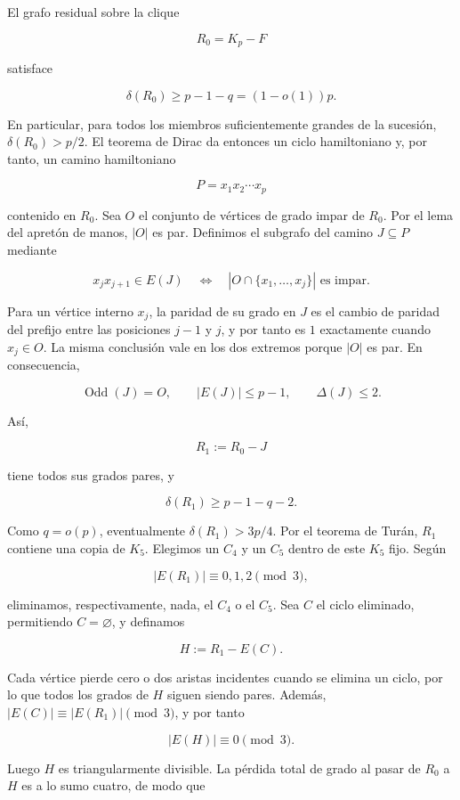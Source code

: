 \documentclass[
  11pt,
]{article}
\begin{document}
El grafo residual sobre la clique

\[
R_0=K_p-F
\]

satisface

\[
\delta(R_0)
\ge
p-1-q
=(1-o(1))p.
\tag{8.4}
\]

En particular, para todos los miembros suficientemente grandes de la
sucesión, \(\delta(R_0)>p/2\). El teorema de Dirac da entonces un ciclo
hamiltoniano y, por tanto, un camino hamiltoniano

\[
P=x_1x_2\cdots x_p
\]

contenido en \(R_0\). Sea \(O\) el conjunto de vértices de grado impar
de \(R_0\). Por el lema del apretón de manos, \(|O|\) es par. Definimos
el subgrafo del camino \(J\subseteq P\) mediante

\[
x_jx_{j+1}\in E(J)
\quad\Longleftrightarrow\quad
|O\cap\{x_1,\ldots,x_j\}|\text{ es impar}.
\tag{8.5}
\]

Para un vértice interno \(x_j\), la paridad de su grado en \(J\) es el
cambio de paridad del prefijo entre las posiciones \(j-1\) y \(j\), y
por tanto es \(1\) exactamente cuando \(x_j\in O\). La misma conclusión
vale en los dos extremos porque \(|O|\) es par. En consecuencia,

\[
\operatorname{Odd}(J)=O,
\qquad
|E(J)|\le p-1,
\qquad
\Delta(J)\le2.
\tag{8.6}
\]

Así,

\[
R_1:=R_0-J
\]

tiene todos sus grados pares, y

\[
\delta(R_1)\ge p-1-q-2.
\tag{8.7}
\]

Como \(q=o(p)\), eventualmente \(\delta(R_1)>3p/4\). Por el teorema de
Turán, \(R_1\) contiene una copia de \(K_5\). Elegimos un \(C_4\) y un
\(C_5\) dentro de este \(K_5\) fijo. Según

\[
|E(R_1)|\equiv0,1,2\pmod3,
\]

eliminamos, respectivamente, nada, el \(C_4\) o el \(C_5\). Sea \(C\) el
ciclo eliminado, permitiendo \(C=\varnothing\), y definamos

\[
H:=R_1-E(C).
\]

Cada vértice pierde cero o dos aristas incidentes cuando se elimina un
ciclo, por lo que todos los grados de \(H\) siguen siendo pares. Además,
\(|E(C)|\equiv |E(R_1)|\pmod3\), y por tanto

\[
|E(H)|\equiv0\pmod3.
\]

Luego \(H\) es triangularmente divisible. La pérdida total de grado al
pasar de \(R_0\) a \(H\) es a lo sumo cuatro, de modo que
\end{document}
